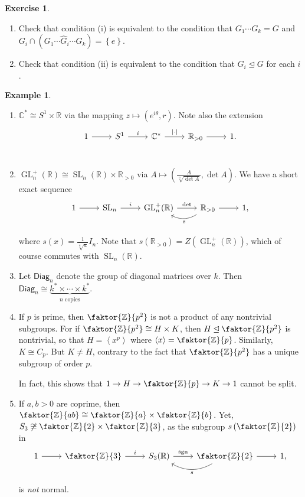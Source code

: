\documentclass[10pt,letterpaper,cm]{nupset}
\theoremstyle{definition}
\newtheorem{exmp}[definition]{Example}
\theoremstyle{theorem}
\newtheorem{exercise}[definition]{Exercise}
\theoremstyle{remark}
\newcommand{\C}{\mathbb C}
\newcommand{\R}{\mathbb R}
\newcommand{\Z}{\mathbb Z}
\newcommand{\1}{\mathbf{1}}
\newcommand{\0}{\vec 0}
\DeclareMathOperator*{\GL}{GL}
\DeclareMathOperator*{\SL}{SL}
\DeclareMathOperator{\sgn}{sgn}
\begin{document}
\begin{exercise} $ $
\begin{enumerate}
\item Check that condition (i) is equivalent to the condition that $G_1 \cdots G_k = G$ and $G_i \cap \left(G_1 \cdots \widehat{G}_i \cdots G_k\right) = \left\{e\right\}$.
\item Check that condition (ii) is equivalent to the condition that $G_i \unlhd G$ for each $i$.
\end{enumerate}
\end{exercise}

\begin{exmp} $ $
\begin{enumerate}
\item $\C^{\ast} \cong S^1 \times \R$ via the mapping $z \mapsto \left(e^{i\theta}, r\right)$. Note also the extension \[
	\begin{tikzcd}
	1\rar & S^1\rar["i" above] & \C^{\ast}\rar["\left\lvert{\cdot}\right\rvert" above] & \R_{>0}\rar & 1. \\
	\end{tikzcd}
\]
\item $\GL_n^{+}(\R) \cong \SL_n(\R) \times \R_{>0}$ via $A\mapsto \left(\frac{A}{\sqrt[n]{\det A}}, \det A\right)$.
We have a short exact sequence  \[
	\begin{tikzcd}
	1\rar & \SL_n\rar["i" above] & \GL_n^{+}(\R)\rar["\det" above] & \R_{>0}\rar\lar[bend left=30,"s" below] & 1, \\
	\end{tikzcd}
\] where $s(x) = \frac{1}{\sqrt[n]{a}}I_n$. Note that $s(\R_{>0}) = Z(\GL_n^+(\R))$, which of course commutes with $\SL_n(\R)$.
\item Let $\mathsf{Diag}_n$ denote the group of diagonal matrices over $k$. Then $\mathsf{Diag}_n \cong \underbrace{k^{\ast}\times \cdots \times k^{\ast}}_{n \text{ copies}}.$
\item If $p$ is prime, then $\faktor{\Z}{p^2}$ is not a product of any nontrivial subgroups. For if $\faktor{\Z}{p^2} \cong H \times K$, then $H \unlhd \faktor{\Z}{p^2}$ is nontrivial, so that $H = \left\langle x^p \right\rangle$ where $\left\langle x \right\rangle = \faktor{\Z}{p}$. Similarly, $K \cong C_p$. But $K \ne H$, contrary to the fact that $\faktor{\Z}{p^2}$ has a unique subgroup of order $p$. 
\medskip

 In fact, this shows that $1 \to H \to \faktor{\Z}{p} \to K \to 1$ cannot be split.
\item If $a, b >0$ are coprime, then $\faktor{\Z}{ab} \cong \faktor{\Z}{a} \times \faktor{\Z}{b}$. Yet, $S_3 \not \cong \faktor{\Z}{2} \times \faktor{\Z}{3}$, as the subgroup $s\left(\faktor{\Z}{2}\right)$ in 
\[
	\begin{tikzcd}
	1\rar & \faktor{\Z}{3}\rar["i" above] & S_3(\R)\rar["\sgn" above] & \faktor{\Z}{2}\rar\lar[bend left=30,"s" below] & 1, \\
	\end{tikzcd}
\] is \emph{not} normal.
\end{enumerate}
\end{exmp}
\end{document}
